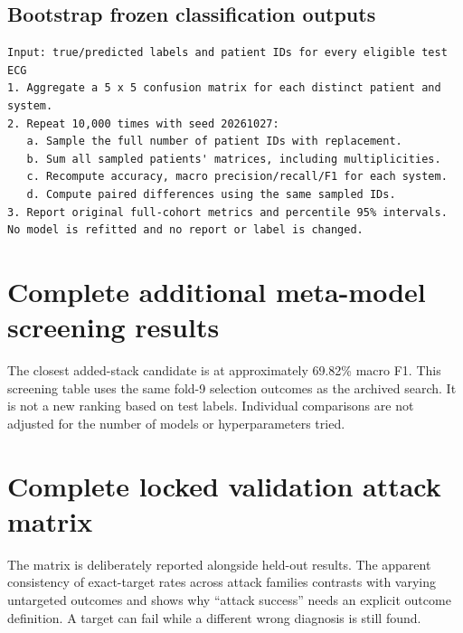 \subsection{Bootstrap frozen classification outputs}
\begin{lstlisting}
Input: true/predicted labels and patient IDs for every eligible test ECG
1. Aggregate a 5 x 5 confusion matrix for each distinct patient and system.
2. Repeat 10,000 times with seed 20261027:
   a. Sample the full number of patient IDs with replacement.
   b. Sum all sampled patients' matrices, including multiplicities.
   c. Recompute accuracy, macro precision/recall/F1 for each system.
   d. Compute paired differences using the same sampled IDs.
3. Report original full-cohort metrics and percentile 95% intervals.
No model is refitted and no report or label is changed.
\end{lstlisting}

\section{Complete additional meta-model screening results}
\label{app:candidates}
\begin{table}[H]\centering\small

\caption{All 17 additional validation-screened candidate sources. Standalone scores use fold-9 outputs; added-stack values are each candidate's best patient-grouped stacker OOF selection score. The released baseline is 69.876\% OOF macro F1. The candidate labels are the experiment's recorded names, not new fitted models.}
\end{table}
The closest added-stack candidate is  at approximately 69.82\% macro F1. This screening table uses the same fold-9 selection outcomes as the archived search. It is not a new ranking based on test labels. Individual comparisons are not adjusted for the number of models or hyperparameters tried.

\section{Complete locked validation attack matrix}
\label{app:securityvalidation}
\begin{table}[H]\centering\scriptsize
\resizebox{\linewidth}{!}{}
\caption{Locked validation E1 results for the C3 configuration. Targeted ASR intervals use the saved 10,000-resample patient bootstrap. Each row is ten patients with three seeds. These rows were available during attack selection; they are not independent held-out estimates.}
\end{table}
The matrix is deliberately reported alongside held-out results. The apparent consistency of exact-target rates across attack families contrasts with varying untargeted outcomes and shows why ``attack success'' needs an explicit outcome definition. A target can fail while a different wrong diagnosis is still found.

